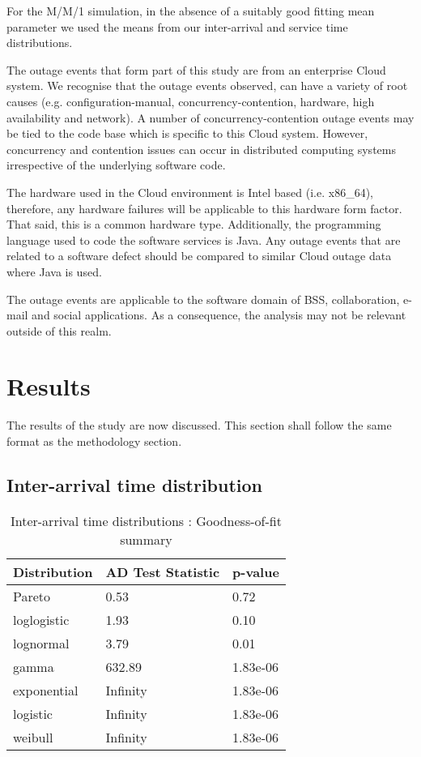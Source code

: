 \documentclass[5p]{elsarticle}
\begin{document}
For the M/M/1 simulation, in the absence of a suitably good fitting mean parameter we used the means from our inter-arrival and service time distributions.

The outage events that form part of this study are from an enterprise Cloud system. We recognise that the outage events observed, can have a variety of root causes (e.g. configuration-manual, concurrency-contention, hardware, high availability and network). A number of concurrency-contention outage events may be tied to the code base which is specific to this Cloud system. However, concurrency and contention issues can occur in distributed computing systems irrespective of the underlying software code.

The hardware used in the Cloud environment is Intel based (i.e. x86\_64), therefore, any hardware failures will be applicable to this hardware form factor. That said, this is a common hardware type. Additionally, the programming language used to code the software services is Java. Any outage events that are related to a software defect should be compared to similar Cloud outage data where Java is used.

The outage events are applicable to the software domain of BSS, collaboration, e-mail and social applications. As a consequence, the analysis may not be relevant outside of this realm.

\section{Results}
The results of the study are now discussed. This section shall follow the same format as the methodology section.

\subsection{Inter-arrival time distribution}

\begin {table}
\caption {Inter-arrival time distributions :  Goodness-of-fit summary} 
\begin{center}
\begin{tabular}{p{2.1cm} |  p{3.1cm} | p{1.3cm}} \hline \bf{Distribution} & \bf{AD Test Statistic} & \bf{p-value}
\\ \hline Pareto & 0.53 & 0.72 
\\ loglogistic & 1.93 & 0.10
\\ lognormal & 3.79 & 0.01
\\ gamma & 632.89 & 1.83e-06	
\\ exponential & Infinity  & 1.83e-06
\\ logistic & Infinity & 1.83e-06	
\\ weibull  & Infinity & 1.83e-06 
\\ \hline
\end{tabular}
\end{center}
\end{table}
\end{document}
